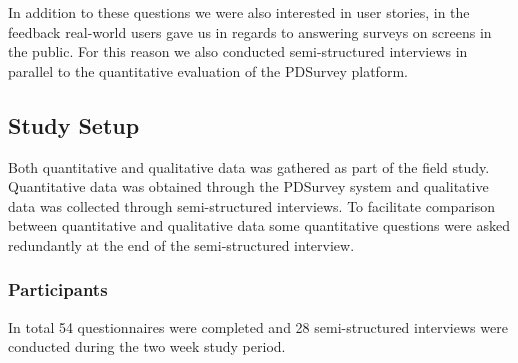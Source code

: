 	In addition to these questions we were also interested in user stories, in the feedback real-world users gave us in regards to answering surveys on screens in the public. For this reason we also conducted semi-structured interviews in parallel to the quantitative evaluation of the PDSurvey platform.




\subsection{Study Setup}

	Both quantitative and qualitative data was gathered as part of the field study. Quantitative data was obtained through the PDSurvey system and qualitative data was collected through semi-structured interviews. To facilitate comparison between quantitative and qualitative data some quantitative questions were asked redundantly at the end of the semi-structured interview.




	\subsubsection{Participants}

		In total 54 questionnaires were completed and 28 semi-structured interviews were conducted during the two week study period.

